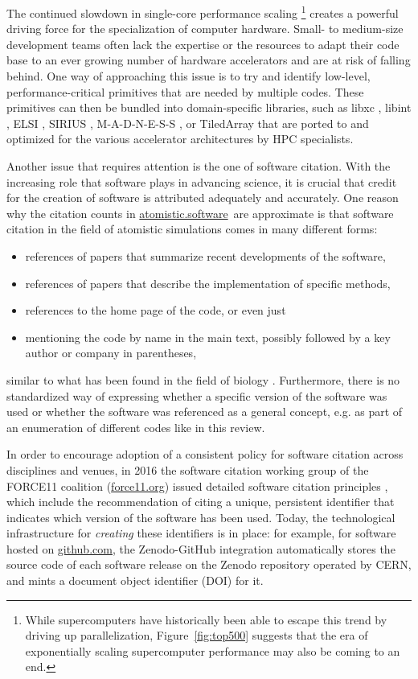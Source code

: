 \documentclass[9pt,review]{livecoms}
\newcommand{\atsoft}{\href{https://atomistic.software}{atomistic.software}\ }
\begin{document}
The continued slowdown in single-core performance scaling%
\footnote{While supercomputers have historically been able to escape this trend by driving up parallelization, Figure~\ref{fig:top500} suggests that the era of exponentially scaling supercomputer performance may also be coming to an end.}
creates a powerful driving force for the specialization of computer hardware.
Small- to medium-size development teams often lack the expertise or the resources to adapt their code base to an ever growing number of hardware accelerators and are at risk of falling behind.
One way of approaching this issue is to try and identify low-level, performance-critical primitives that are needed by multiple codes. 
These primitives can then be bundled into domain-specific libraries, such as libxc \cite{Lehtola2018}, libint \cite{Valeyev2021}, ELSI \cite{Yu2020}, SIRIUS \cite{Sirius2021}, M-A-D-N-E-S-S \cite{Harrison2016}, or TiledArray \cite{Calvin2021} that are ported to and optimized for the various accelerator architectures by HPC specialists.

Another issue that requires attention is the one of software citation.
With the increasing role that software plays in advancing science, it is crucial that credit for the creation of software is attributed adequately and accurately.
One reason why the citation counts in \atsoft are approximate is that software citation in the field of atomistic simulations comes in many different forms: 
\begin{itemize}
    \item references of papers that summarize recent developments of the software,
    \item references of papers that describe the implementation of specific methods,
    \item references to the home page of the code, or even just
    \item mentioning the code by name in the main text, possibly followed by a key author or company in parentheses,
\end{itemize}
similar to what has been found in the field of biology \cite{Howison2016}.
Furthermore, there is no standardized way of expressing whether a specific version of the software was used or whether the software was referenced as a general concept, e.g. as part of an enumeration of different codes like in this review.

In order to encourage adoption of a consistent policy for software citation across disciplines and venues, in 2016 the software citation working group of the FORCE11 coalition (\url{force11.org}) issued detailed software citation principles \cite{Smith2016}, which include the recommendation of citing a unique, persistent identifier that indicates which version of the software has been used.
Today, the technological infrastructure for \emph{creating} these identifiers is in place:
for example, for software hosted on \url{github.com}, the Zenodo-GitHub integration \cite{zenodo-github-integration} automatically stores the source code of each software release on the Zenodo repository operated by CERN, and mints a document object identifier (DOI) for it.
\end{document}

